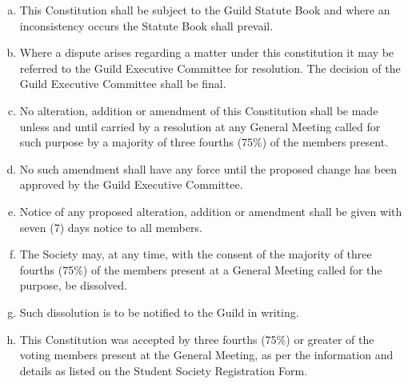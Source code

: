\documentclass[a4paper,12pt]{article}
\begin{document}
\begin{enumerate}[a)]
	\item This Constitution shall be subject to the Guild Statute Book and where an inconsistency occurs the Statute Book shall prevail.
	\item Where a dispute arises regarding a matter under this constitution it may be referred to the Guild Executive Committee for resolution. The decision of the Guild Executive Committee shall be final.
	\item No alteration, addition or amendment of this Constitution shall be made unless and until carried by a resolution at any General Meeting called for such purpose by a majority of three fourths (75\%) of the members present.
	\item No such amendment shall have any force until the proposed change has been approved by the Guild Executive Committee.
	\item Notice of any proposed alteration, addition or amendment shall be given with seven (7) days notice to all members.
	\item The Society may, at any time, with the consent of the majority of three fourths (75\%) of the members present at a General Meeting called for the purpose, be dissolved.
	\item Such dissolution is to be notified to the Guild in writing.
	\item This Constitution was accepted by three fourths (75\%) or greater of the voting members present at the General Meeting, as per the information and details as listed on the Student Society Registration Form.
\end{enumerate}
\end{document}
